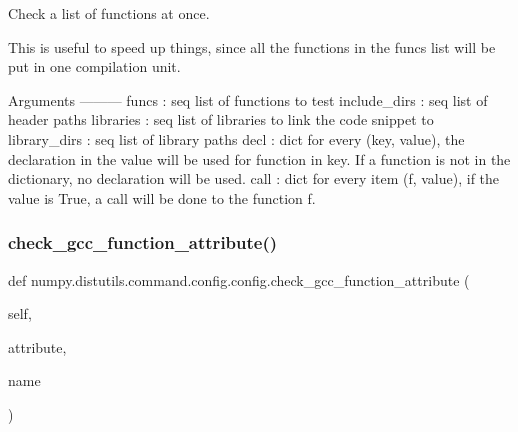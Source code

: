 \begin{DoxyVerb}Check a list of functions at once.

This is useful to speed up things, since all the functions in the funcs
list will be put in one compilation unit.

Arguments
---------
funcs : seq
    list of functions to test
include_dirs : seq
    list of header paths
libraries : seq
    list of libraries to link the code snippet to
library_dirs : seq
    list of library paths
decl : dict
    for every (key, value), the declaration in the value will be
    used for function in key. If a function is not in the
    dictionary, no declaration will be used.
call : dict
    for every item (f, value), if the value is True, a call will be
    done to the function f.
\end{DoxyVerb}
 \mbox{\label{classnumpy_1_1distutils_1_1command_1_1config_1_1config_ae0c5031e98e740f8afe22360fd525a0f}} 
\subsubsection{\texorpdfstring{check\+\_\+gcc\+\_\+function\+\_\+attribute()}{check\_gcc\_function\_attribute()}}
{\footnotesize\ttfamily def numpy.\+distutils.\+command.\+config.\+config.\+check\+\_\+gcc\+\_\+function\+\_\+attribute (\begin{DoxyParamCaption}\item[{}]{self,  }\item[{}]{attribute,  }\item[{}]{name }\end{DoxyParamCaption})}

\mbox{\label{classnumpy_1_1distutils_1_1command_1_1config_1_1config_abcb6bb5fb63a22b8dc39d42df537be7b}} 
